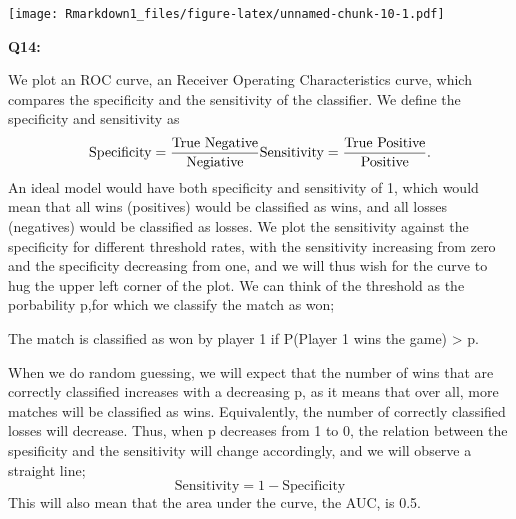 \documentclass[]{article}
\newenvironment{Shaded}{\begin{snugshade}}{\end{snugshade}}
\newcommand{\KeywordTok}[1]{\textcolor[rgb]{0.13,0.29,0.53}{\textbf{#1}}}
\newcommand{\DataTypeTok}[1]{\textcolor[rgb]{0.13,0.29,0.53}{#1}}
\newcommand{\DecValTok}[1]{\textcolor[rgb]{0.00,0.00,0.81}{#1}}
\newcommand{\StringTok}[1]{\textcolor[rgb]{0.31,0.60,0.02}{#1}}
\newcommand{\CommentTok}[1]{\textcolor[rgb]{0.56,0.35,0.01}{\textit{#1}}}
\newcommand{\OtherTok}[1]{\textcolor[rgb]{0.56,0.35,0.01}{#1}}
\newcommand{\OperatorTok}[1]{\textcolor[rgb]{0.81,0.36,0.00}{\textbf{#1}}}
\newcommand{\NormalTok}[1]{#1}
\begin{document}
\texttt{[image: Rmarkdown1\_files/figure-latex/unnamed-chunk-10-1.pdf]}

\textbf{Q14:}

We plot an ROC curve, an Receiver Operating Characteristics curve, which
compares the specificity and the sensitivity of the classifier. We
define the specificity and sensitivity as
\[\text{Specificity} = \frac{\text{True Negative}}{\text{Negiative}}\\ \text{Sensitivity} = \frac{\text{True Positive}}{\text{Positive}}.\]
An ideal model would have both specificity and sensitivity of 1, which
would mean that all wins (positives) would be classified as wins, and
all losses (negatives) would be classified as losses. We plot the
sensitivity against the specificity for different threshold rates, with
the sensitivity increasing from zero and the specificity decreasing from
one, and we will thus wish for the curve to hug the upper left corner of
the plot. We can think of the threshold as the porbability p,for which
we classify the match as won;

The match is classified as won by player 1 if P(Player 1 wins the game)
\textgreater{} p.

When we do random guessing, we will expect that the number of wins that
are correctly classified increases with a decreasing p, as it means that
over all, more matches will be classified as wins. Equivalently, the
number of correctly classified losses will decrease. Thus, when p
decreases from 1 to 0, the relation between the spesificity and the
sensitivity will change accordingly, and we will observe a straight
line; \[\text{Sensitivity} = 1 - \text{Specificity}\] This will also
mean that the area under the curve, the AUC, is 0.5.

\begin{Shaded}
\end{Shaded}
\end{document}
